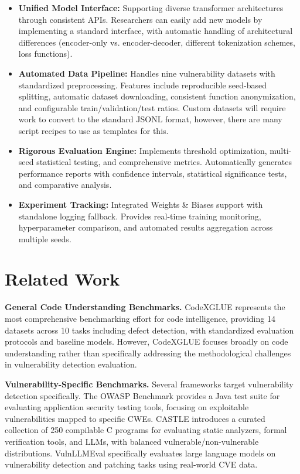 \documentclass[letterpaper]{article}
\begin{document}
\begin{itemize}
	\item \textbf{Unified Model Interface:} Supporting diverse transformer architectures through consistent APIs. Researchers can easily add new models by implementing a standard interface, with automatic handling of architectural differences (encoder-only vs. encoder-decoder, different tokenization schemes, loss functions).
	\item \textbf{Automated Data Pipeline:} Handles nine vulnerability datasets with standardized preprocessing. Features include reproducible seed-based splitting, automatic dataset downloading, consistent function anonymization, and configurable train/validation/test ratios. Custom datasets will require work to convert to the standard JSONL format, however, there are many script recipes to use as templates for this.
	\item \textbf{Rigorous Evaluation Engine:} Implements threshold optimization, multi-seed statistical testing, and comprehensive metrics. Automatically generates performance reports with confidence intervals, statistical significance tests, and comparative analysis.
	\item \textbf{Experiment Tracking:} Integrated Weights \& Biases support with standalone logging fallback. Provides real-time training monitoring, hyperparameter comparison, and automated results aggregation across multiple seeds.

\end{itemize}
\section{Related Work}

\textbf{General Code Understanding Benchmarks.} CodeXGLUE represents the most comprehensive benchmarking effort for code intelligence, providing 14 datasets across 10 tasks including defect detection, with standardized evaluation protocols and baseline models. However, CodeXGLUE focuses broadly on code understanding rather than specifically addressing the methodological challenges in vulnerability detection evaluation.

\textbf{Vulnerability-Specific Benchmarks.} Several frameworks target vulnerability detection specifically. The OWASP Benchmark provides a Java test suite for evaluating application security testing tools, focusing on exploitable vulnerabilities mapped to specific CWEs. CASTLE introduces a curated collection of 250 compilable C programs for evaluating static analyzers, formal verification tools, and LLMs, with balanced vulnerable/non-vulnerable distributions. VulnLLMEval specifically evaluates large language models on vulnerability detection and patching tasks using real-world CVE data.
\end{document}

